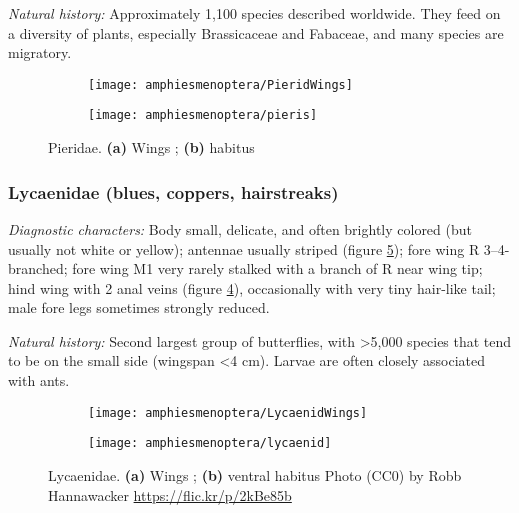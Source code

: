 \noindent{}\textit{Natural history:} Approximately 1,100 species described worldwide. They feed on a diversity of plants, especially Brassicaceae and Fabaceae, and many species are migratory.\vspace{3mm}

\begin{figure}[ht!]
    \centering
    \begin{subfigure}[ht!]{0.25\textwidth}
        \texttt{[image: amphiesmenoptera/PieridWings]}
        \caption{}
        \label{fig:pierid1}
    \end{subfigure}
    \hfill
    \begin{subfigure}[ht!]{0.5\textwidth}
        \texttt{[image: amphiesmenoptera/pieris]}
        \caption{}
        \label{fig:pierid2}
    \end{subfigure}
    \caption{Pieridae. \textbf{(a)} Wings \citep[Fig. 342]{comstock1918wings}; \textbf{(b)} habitus \citep[Modified from Fig. 28 in][]{bhlitem37741}}\label{fig:pierids}
\end{figure}

\subsubsection{Lycaenidae (blues, coppers, hairstreaks)}
\noindent{}\textit{Diagnostic characters:} Body small, delicate, and often brightly colored (but usually not white or yellow); antennae usually striped (figure \ref{fig:lycaenid2}); fore wing R 3--4-branched; fore wing M1 very rarely stalked with a branch of R near wing tip; hind wing with 2 anal veins (figure \ref{fig:lycaenid1}), occasionally with very tiny hair-like tail; male fore legs sometimes strongly reduced.\vspace{3mm}

\noindent{}\textit{Natural history:} Second largest group of butterflies, with \textgreater{}5,000 species that tend to be on the small side (wingspan \textless4 cm). Larvae are often closely associated with ants. \vspace{3mm}

\begin{figure}[ht!]
    \centering
    \begin{subfigure}[ht!]{0.27\textwidth}
        \texttt{[image: amphiesmenoptera/LycaenidWings]}
        \caption{}
        \label{fig:lycaenid1}
    \end{subfigure}
    \hfill
    \begin{subfigure}[ht!]{0.53\textwidth}
        \texttt{[image: amphiesmenoptera/lycaenid]}
        \caption{}
        \label{fig:lycaenid2}
    \end{subfigure}
    \caption{Lycaenidae. \textbf{(a)} Wings \citep[][Fig. 136]{bhl162310}; \textbf{(b)} ventral habitus Photo (CC0) by Robb Hannawacker \url{https://flic.kr/p/2kBe85b}}\label{fig:lycaenids}
\end{figure}

